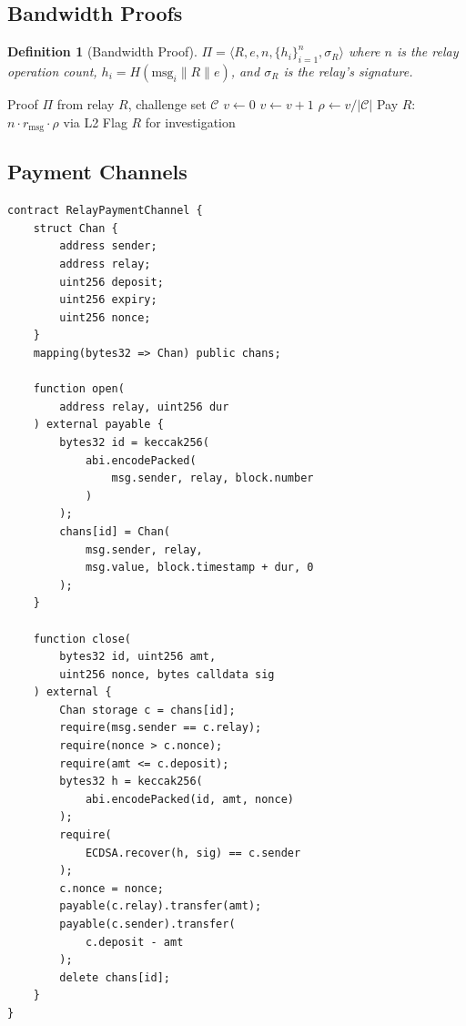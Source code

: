 \documentclass[11pt,a4paper]{article}
\newtheorem{definition}{Definition}[section]
\begin{document}
\subsection{Bandwidth Proofs}

\begin{definition}[Bandwidth Proof]
    $\Pi = \langle R, e, n, \{h_i\}_{i=1}^n, \sigma_R \rangle$
    where $n$ is the relay operation count,
    $h_i = H(\mathrm{msg}_i \| R \| e)$, and $\sigma_R$ is the relay's
    signature.
\end{definition}

\begin{algorithm}[H]
\caption{Bandwidth Proof Verification}
\label{alg:bw-proof}
\begin{algorithmic}[1]
\Require Proof $\Pi$ from relay $R$, challenge set $\mathcal{C}$
\State $v \gets 0$
        \State $v \gets v + 1$
    \EndIf
\EndFor
\State $\rho \gets v / |\mathcal{C}|$
    \State Pay $R$: $n \cdot r_{\mathrm{msg}} \cdot \rho$ via L2
\Else
    \State Flag $R$ for investigation
\EndIf
\end{algorithmic}
\end{algorithm}

\subsection{Payment Channels}

\begin{lstlisting}[language=Solidity,caption={Relay Payment Channel}]
contract RelayPaymentChannel {
    struct Chan {
        address sender;
        address relay;
        uint256 deposit;
        uint256 expiry;
        uint256 nonce;
    }
    mapping(bytes32 => Chan) public chans;

    function open(
        address relay, uint256 dur
    ) external payable {
        bytes32 id = keccak256(
            abi.encodePacked(
                msg.sender, relay, block.number
            )
        );
        chans[id] = Chan(
            msg.sender, relay,
            msg.value, block.timestamp + dur, 0
        );
    }

    function close(
        bytes32 id, uint256 amt,
        uint256 nonce, bytes calldata sig
    ) external {
        Chan storage c = chans[id];
        require(msg.sender == c.relay);
        require(nonce > c.nonce);
        require(amt <= c.deposit);
        bytes32 h = keccak256(
            abi.encodePacked(id, amt, nonce)
        );
        require(
            ECDSA.recover(h, sig) == c.sender
        );
        c.nonce = nonce;
        payable(c.relay).transfer(amt);
        payable(c.sender).transfer(
            c.deposit - amt
        );
        delete chans[id];
    }
}
\end{lstlisting}
\end{document}
